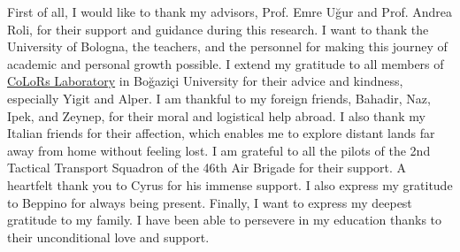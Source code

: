 \begin{acknowledgements}
First of all, I would like to thank my advisors, Prof. Emre Uğur and Prof. Andrea Roli, for their support and guidance during this research.
I want to thank the University of Bologna, the teachers, and the personnel for making this journey of academic and personal growth possible.
I extend my gratitude to all members of \href{https://colors.cmpe.boun.edu.tr}{CoLoRs Laboratory} in Boğaziçi University for their advice and kindness, especially Yigit and Alper. 
I am thankful to my foreign friends, Bahadir, Naz,  Ipek, and Zeynep, for their moral and logistical help abroad. 
I also thank my Italian friends for their affection, which enables me to explore distant lands far away from home without feeling lost. 
I am grateful to all the pilots of the 2nd Tactical Transport Squadron of the 46th Air Brigade for their support.
A heartfelt thank you to Cyrus for his immense support.  
I also express my gratitude to Beppino for always being present.
Finally, I want to express my deepest gratitude to my family. 
I have been able to persevere in my education thanks to their unconditional love and support.
\end{acknowledgements}